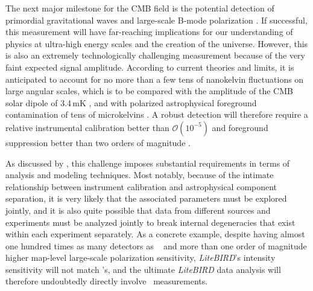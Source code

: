 \documentclass[twocolumn]{openjournal}
\begin{document}
The next major milestone for the CMB field is the potential detection of
primordial gravitational waves and large-scale B-mode polarization
\citep[e.g.,][]{kamionkowski:2016}. If successful, this measurement will have
far-reaching implications for our understanding of physics at ultra-high energy
scales and the creation of the universe. However, this is also an extremely
technologically challenging measurement because of the very faint expected
signal amplitude. According to current theories and limits, it is anticipated
to account for no more than a few tens of nanokelvin fluctuations on large
angular scales, which is to be compared with the amplitude of the CMB solar
dipole of 3.4\,mK \citep{fixsen2009}, and with polarized astrophysical
foreground contamination of tens of microkelvins
\citep[e.g.,][]{planck2016-l04}. A robust detection will therefore require a
relative instrumental calibration better than $\mathcal{O}(10^{-5})$ and
foreground suppression better than two orders of magnitude
\citep[e.g.,][]{bp07,bp14}.

As discussed by \citet{bp01}, this challenge imposes substantial requirements
in terms of analysis and modeling techniques. Most notably, because of the
intimate relationship between instrument calibration and astrophysical
component separation, it is very likely that the associated parameters must be
explored jointly, and it is also quite possible that data from different
sources and experiments must be analyzed jointly to break internal degeneracies
that exist within each experiment separately. As a concrete example, despite
having almost one hundred times as many detectors as \Planck\
\citep{planck2016-l01} and more than one order of magnitude higher map-level
large-scale polarization sensitivity, \textit{LiteBIRD}'s \citep{litebird2022}
intensity sensitivity will not match \Planck's, and the ultimate
\textit{LiteBIRD} data analysis will therefore undoubtedly directly involve
\Planck\ measurements.
\end{document}
